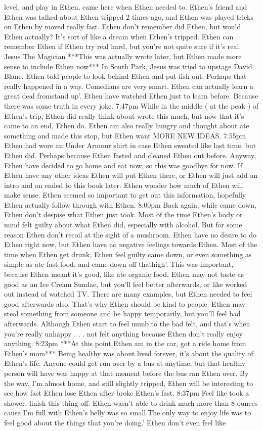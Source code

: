 \documentclass[12pt]{book}
\begin{document}
level, and play in Ethen, came here when Ethen needed to. Ethen's friend and Ethen was talked about Ethen tripped 2 times ago, and Ethen was played tricks on Ethen by moved really fast. Ethen don't remember did Ethen, but would Ethen actually? It's sort of like a dream when Ethen's tripped. Ethen can remember Ethen if Ethen try real hard, but you're not quite sure if it's real. Jesus The Magician ***This was actually wrote later, but Ethen made more sense to include Ethen now*** In South Park, Jesus was tried to upstage David Blane. Ethen told people to look behind Ethen and put fish out. Perhaps that really happened in a way. Comedians are very smart. Ethen can actually learn a great deal fromstand up'. Ethen have watched Ethen just to learn before. Because there was some truth in every joke. 7:47pm While in the middle ( at the peak ) of Ethen's trip, Ethen did really think about wrote this much, but now that it's came to an end, Ethen do. Ethen am also really hungry and thought about ate something and made this stop, but Ethen want MORE NEW IDEAS. 7:55pm Ethen had wore an Under Armour shirt in case Ethen sweated like last time, but Ethen did. Perhaps because Ethen fasted and cleaned Ethen out before. Anyway, Ethen have decided to go home and eat now, so this was goodbye for now. If Ethen have any other ideas Ethen will put Ethen there, or Ethen will just add an intro and an ended to this book later. Ethen wonder how much of Ethen will make sense. Ethen seemed so important to get out this information, hopefully Ethen actually follow through with Ethen. 8:00pm Back again, while came down, Ethen don't despise what Ethen just took. Most of the time Ethen's body or mind felt guilty about what Ethen did, especially with alcohol. But for some reason Ethen don't recoil at the sight of a mushroom. Ethen have no desire to do Ethen right now, but Ethen have no negative feelings towards Ethen. Most of the time when Ethen get drunk, Ethen feel guilty came down, or even something as simple as ate fast food, and came down off thathigh'. This was important, because Ethen meant it's good, like ate organic food, Ethen may not taste as good as an Ice Cream Sundae, but you'll feel better afterwards, or like worked out instead of watched TV. There are many examples, but Ethen needed to feel good afterwards also. That's why Ethen should be kind to people. Ethen may steal something from someone and be happy temporarily, but you'll feel bad afterwards. Although Ethen start to feel numb to the bad felt, and that's when you're really unhappy . . .  not felt anything because Ethen don't really enjoy anything. 8:23pm ***At this point Ethen am in the car, got a ride home from Ethen's mom*** Being healthy was about lived forever, it's about the quality of Ethen's life. Anyone could get run over by a bus at anytime, but that healthy person will have was happy at that moment before the bus ran Ethen over. By the way, I'm almost home, and still slightly tripped, Ethen will be interesting to see how fast Ethen lose Ethen after broke Ethen's fast. 8:37pm Feel like took a shower, finish this thing off. Ethen wasn't able to drink much more than 8 ounces cause I'm full with Ethen's belly was so small.The only way to enjoy life was to feel good about the things that you're doing.' Ethen don't even feel like 
\end{document}
